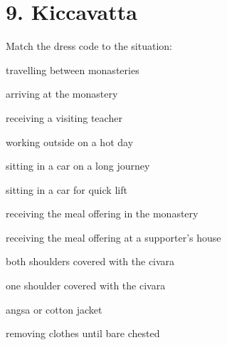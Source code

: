 \chapter{9. Kiccavatta}
\renewcommand*{\theChapterTitle}{9. Kiccavatta}

\begin{exam}{\autoExamName}

\begin{problem*}

  Match the dress code to the situation:

  \bigskip

  \begin{multicols}{2}

    \begin{parts}

    \item \fillin{2cm}{\ref{both}} travelling between monasteries
    \item \fillin{2cm}{\ref{one}} arriving at the monastery
    \item \fillin{2cm}{\ref{one}} receiving a visiting teacher
    \item \fillin{2cm}{\ref{angsa}} working outside on a hot day
    \item \fillin{2cm}{\ref{both}} sitting in a car on a long journey
    \item \fillin{2cm}{\ref{both}} sitting in a car for quick lift
    \item \fillin{2cm}{\ref{one}} receiving the meal offering in the monastery
    \item \fillin{2cm}{\ref{both}} receiving the meal offering at a supporter's house

    \columnbreak

    \bMatchChoices

    \item\label{both} both shoulders covered with the civara
    \item\label{one} one shoulder covered with the civara
    \item\label{angsa} angsa or cotton jacket
    \item\label{bare} removing clothes until bare chested

    \eMatchChoices

    \end{parts}
  
  \end{multicols}

\end{problem*}


\end{exam}
